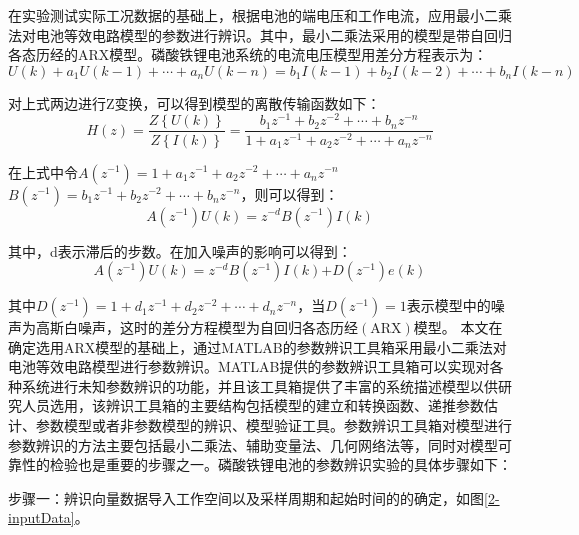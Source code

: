 在实验测试实际工况数据的基础上，根据电池的端电压和工作电流，应用最小二乘法对电池等效电路模型的参数进行辨识。其中，最小二乘法采用的模型是带自回归各态历经的ARX模型。磷酸铁锂电池系统的电流电压模型用差分方程表示为：
\begin{equation}
U\left( k \right)+{{a}_{1}}U(k-1)+\cdots +{{a}_{n}}U(k-n)={{b}_{1}}I\left( k-1 \right)+{{b}_{2}}I\left( k-2 \right)+\cdots +{{b}_{n}}I(k-n)
\end{equation}

对上式两边进行Z变换，可以得到模型的离散传输函数如下：
\begin{equation}
H\left( z \right)=\frac{Z\left\{ U\left( k \right) \right\}}{Z\left\{ I\left( k \right) \right\}}=\frac{{{b}_{1}}{{z}^{-1}}+{{b}_{2}}{{z}^{-2}}+\cdots +{{b}_{n}}{{z}^{-n}}}{1+{{a}_{1}}{{z}^{-1}}+{{a}_{2}}{{z}^{-2}}+\cdots +{{a}_{n}}{{z}^{-n}}}
\end{equation}

在上式中令$A\left( {{z}^{-1}} \right)=1+{{a}_{1}}z{}^{-1}+{{a}_{2}}{{z}^{-2}}+\cdots +{{a}_{n}}{{z}^{-n}}$~$B\left( {{z}^{-1}} \right)={{b}_{1}}{{z}^{-1}}+{{b}_{2}}{{z}^{-2}}+\cdots +{{b}_{n}}{{z}^{-n}}$，则可以得到：
\begin{equation}
A\left( {{z}^{-1}} \right)U\left( k \right)={{z}^{-d}}B\left( {{z}^{-1}} \right)I\left( k \right)
\end{equation}

其中，d表示滞后的步数。在加入噪声的影响可以得到：
\begin{equation}
A\left( {{z}^{-1}} \right)U\left( k \right)={{z}^{-d}}B\left( {{z}^{-1}} \right)I\left( k \right)\text{+}D\left( {{z}^{-1}} \right)e\left( k \right)
\end{equation}

其中$D\left( {{z}^{-1}} \right)=1+{{d}_{1}}{{z}^{-1}}+{{d}_{2}}{{z}^{-2}}+\cdots +{{d}_{n}}{{z}^{-n}}$，当$D\left( {{z}^{-1}} \right)=1$表示模型中的噪声为高斯白噪声，这时的差分方程模型为自回归各态历经$\left( \text{ARX} \right)$模型。
	本文在确定选用ARX模型的基础上，通过MATLAB的参数辨识工具箱采用最小二乘法对电池等效电路模型进行参数辨识。MATLAB提供的参数辨识工具箱可以实现对各种系统进行未知参数辨识的功能，并且该工具箱提供了丰富的系统描述模型以供研究人员选用，该辨识工具箱的主要结构包括模型的建立和转换函数、递推参数估计、参数模型或者非参数模型的辨识、模型验证工具。参数辨识工具箱对模型进行参数辨识的方法主要包括最小二乘法、辅助变量法、几何网络法等，同时对模型可靠性的检验也是重要的步骤之一。磷酸铁锂电池的参数辨识实验的具体步骤如下：

步骤一：辨识向量数据导入工作空间以及采样周期和起始时间的的确定，如图\ref{2-inputData}。

